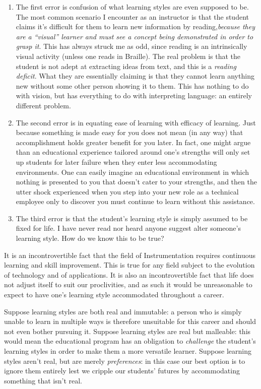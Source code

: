 \begin{enumerate}
\item The first error is confusion of what learning styles are even supposed to be.  The most common scenario I encounter as an instructor is that the student claims it's difficult for them to learn new information by reading,\textit{because they are a ``visual'' learner and must see a concept being demonstrated in order to grasp it}.  This has always struck me as odd, since reading is an intrinsically visual activity (unless one reads in Braille).  The real problem is that the student is not adept at extracting ideas from text, and this is a \textit{reading deficit}.  What they are essentially claiming is that they cannot learn anything new without some other person showing it to them.  This has nothing to do with vision, but has everything to do with interpreting language: an entirely different problem.
\item The second error is in equating ease of learning with efficacy of learning.  Just because something is made easy for you does not mean (in any way) that accomplishment holds greater benefit for you later.  In fact, one might argue than an educational experience tailored around one's strengths will only set up students for later failure when they enter less accommodating environments.  One can easily imagine an educational environment in which nothing is presented to you that doesn't cater to your strengths, and then the utter shock experienced when you step into your new role as a technical employee only to discover you must continue to learn without this assistance.
\item The third error is that the student's learning style is simply assumed to be fixed for life.  I have never read nor heard anyone suggest alter someone's learning style.  How do we know this to be true?
\end{enumerate}

It is an incontrovertible fact that the field of Instrumentation requires continuous learning and skill improvement.  This is true for any field subject to the evolution of technology and of applications.  It is also an incontrovertible fact that life does not adjust itself to suit our proclivities, and as such it would be unreasonable to expect to have one's learning style accommodated throughout a career.  

Suppose learning styles are both real and immutable: a person who is simply unable to learn in multiple ways is therefore unsuitable for this career and should not even bother pursuing it.  Suppose learning styles are real but malleable: this would mean the educational program has an obligation to \textit{challenge} the student's learning styles in order to make them a more versatile learner.  Suppose learning styles aren't real, but are merely \textit{preferences}: in this case our best option is to ignore them entirely lest we cripple our students' futures by accommodating something that isn't real.

